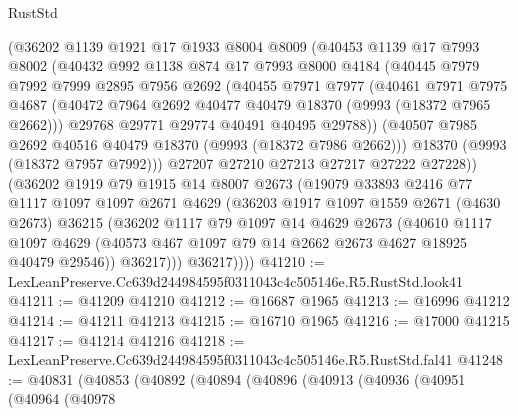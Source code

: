 \begin{lexlean}{RustStd}
\begin{coremodule}
        (@36202
          @1139
          @1921
          @17
          @1933
          @8004
          @8009
          (@40453
            @1139
            @17
            @7993
            @8002
            (@40432
              @992
              @1138
              @874
              @17
              @7993
              @8000
              @4184
              (@40445
                @7979
                @7992
                @7999
                @2895
                @7956
                @2692
                (@40455
                  @7971
                  @7977
                  (@40461
                    @7971
                    @7975
                    @4687
                    (@40472 @7964 @2692 @40477 @40479 @18370 (@9993 (@18372 @7965 @2662)))
                    @29768
                    @29771
                    @29774
                    @40491
                    @40495
                    @29788))
                (@40507 @7985 @2692 @40516 @40479 @18370 (@9993 (@18372 @7986 @2662)))
                @18370
                (@9993 (@18372 @7957 @7992)))
              @27207
              @27210
              @27213
              @27217
              @27222
              @27228))
          (@36202
            @1919
            @79
            @1915
            @14
            @8007
            @2673
            (@19079
              @33893
              @2416
              @77
              @1117
              @1097
              @1097
              @2671
              @4629
              (@36203
                @1917
                @1097
                @1559
                @2671
                (@4630 @2673)
                @36215
                (@36202
                  @1117
                  @79
                  @1097
                  @14
                  @4629
                  @2673
                  (@40610
                    @1117
                    @1097
                    @4629
                    (@40573 @467 @1097 @79 @14 @2662 @2673 @4627 @18925 @40479 @29546))
                  @36217)))
            @36217))))
@41210 := LexLeanPreserve.Cc639d244984595f0311043c4c505146e.R5.RustStd.look41
@41211 := @41209 @41210
@41212 := @16687 @1965
@41213 := @16996 @41212
@41214 := @41211 @41213
@41215 := @16710 @1965
@41216 := @17000 @41215
@41217 := @41214 @41216
@41218 := LexLeanPreserve.Cc639d244984595f0311043c4c505146e.R5.RustStd.fal41
@41248 := @40831
    (@40853
      (@40892
        (@40894
          (@40896
            (@40913
              (@40936
                (@40951
                  (@40964
                    (@40978

\end{coremodule}
\end{lexlean}

